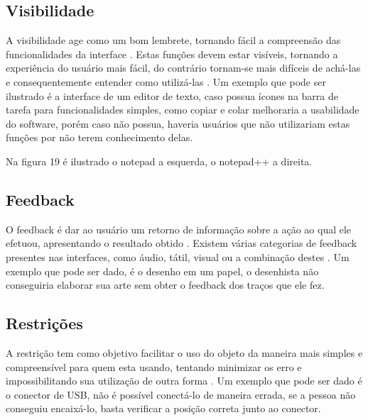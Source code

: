 \documentclass[12pt,oneside,a4paper,chapter=TITLE,section=TITLE,sumario=tradicional]{abntex2}
\begin{document}
\subsection{Visibilidade}
\label{sec:visibilidade}

A visibilidade age como um bom lembrete, tornando fácil a compreensão das funcionalidades da interface \cite{norman2002}. Estas funções devem estar visíveis, tornando a experiência do usuário mais fácil, do contrário tornam-se mais difíceis de achá-las e consequentemente entender como utilizá-las \cite{agni2015}. Um exemplo que pode ser ilustrado é a interface de um editor de texto, caso possua ícones na barra de tarefa para funcionalidades simples, como copiar e colar melhoraria a usabilidade do software, porém caso não possua, haveria usuários que não utilizariam estas funções por não terem conhecimento delas.

Na figura 19 é ilustrado o notepad a esquerda, o notepad++ a direita.

\begin{figure}[htb]
\end{figure}

\subsection{Feedback}
\label{sec:feedback}

O feedback é dar ao usuário um retorno de informação sobre a ação ao qual ele efetuou, apresentando o resultado obtido \cite{norman2002}. Existem várias categorias de feedback presentes nas interfaces, como áudio, tátil, visual ou a combinação destes \cite{agni2015}. Um exemplo que pode ser dado, é o desenho em um papel, o desenhista não conseguiria elaborar sua arte sem obter o feedback dos traços que ele fez.

\subsection{Restrições}
\label{sec:restricoes}

A restrição tem como objetivo facilitar o uso do objeto da maneira mais simples e compreensível para quem esta usando, tentando minimizar os erro e impossibilitando sua utilização de outra forma \cite{norman2002}. Um exemplo que pode ser dado é o conector de USB, não é possível conectá-lo de maneira errada, se a pessoa não conseguiu encaixá-lo, basta verificar a posição correta junto ao conector.
\end{document}

